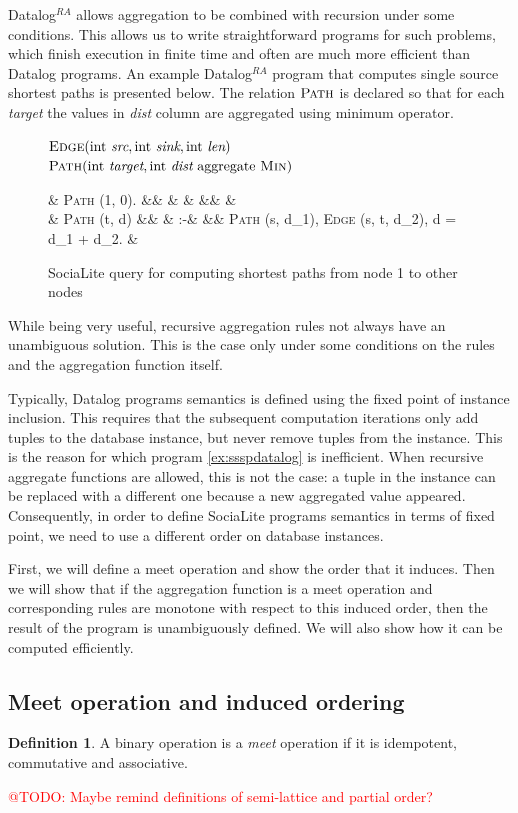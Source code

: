 \documentclass{pracamgr}
\makeatletter
\theoremstyle{plain}
\theoremstyle{definition}
\newtheorem{defn}{Definition}[section]
\theoremstyle{remark}
\newcommand{\todo}[1]{\textcolor{red}{@TODO: #1}}
\newcommand{\datalogra}{Datalog$^{RA}$ }
\newcommand{\assign}{:-}
\newcommand{\narrow}[1]{\begin{changemargin}{2cm}{2cm} #1 \end{changemargin}}
\newcommand{\dprog}[4]{
  \begin{figure}[h!]
    \narrow{
      #1
      \begin{flalign*}
      #2
      \end{flalign*}
      \caption{#3}
      \label{#4}
    }
\end{figure}

}
\makeatother
\begin{document}
\datalogra allows aggregation to be combined with recursion under some conditions. This allows us to write straightforward programs for such problems, which finish execution in finite time and often are much more efficient than Datalog programs. An example \datalogra program that computes single source shortest paths is presented below. The relation $\textsc{Path}$ is declared so that for each \textit{target} the values in \textit{dist} column are aggregated using minimum operator.


\dprog{
  $\textsc{Edge}(\text{int } \textit{src}, \text{int } \textit{sink}, \text{int } \textit{len}) $ \\
  $\textsc{Path}(\text{int } \textit{target}, \text{int } \textit{dist} \text{ aggregate } \textsc{Min}) $
}{
  & \textsc{Path} (1, 0). &&  & & &&  & \\
  & \textsc{Path} (t, d) &&  & \assign & && \textsc{Path} (s, d_1), \textsc{Edge} (s, t, d_2), d = d_1 + d_2. &
}{SociaLite query for computing shortest paths from node 1 to other nodes}{ex:ssspsocialite}

While being very useful, recursive aggregation rules not always have an unambiguous solution. This is the case only under some conditions on the rules and the aggregation function itself.

Typically, Datalog programs semantics is defined using the fixed point of instance inclusion. This requires that the subsequent computation iterations only add tuples to the database instance, but never remove tuples from the instance. This is the reason for which program \ref{ex:ssspdatalog} is inefficient. When recursive aggregate functions are allowed, this is not the case: a tuple in the instance can be replaced with a different one because a new aggregated value appeared. Consequently, in order to define SociaLite programs semantics in terms of fixed point, we need to use a different order on database instances.

First, we will define a meet operation and show the order that it induces. Then we will show that if the aggregation function is a meet operation and corresponding rules are monotone with respect to this induced order, then the result of the program is unambiguously defined. We will also show how it can be computed efficiently.

\subsection{Meet operation and induced ordering}
\begin{defn}
A binary operation is a \emph{meet} operation if it is idempotent, commutative and associative.
\end{defn}
\todo{Maybe remind definitions of semi-lattice and partial order?}
\end{document}
